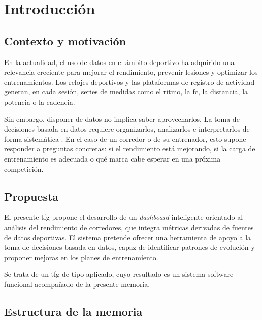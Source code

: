 \chapter{Introducción}
\label{ch:introduccion}


\section{Contexto y motivación}
\label{sec:contexto}

En la actualidad, el uso de datos en el ámbito deportivo ha adquirido una relevancia creciente para mejorar el rendimiento, prevenir lesiones y optimizar los entrenamientos. Los relojes deportivos y las plataformas de registro de actividad generan, en cada sesión, series de medidas como el ritmo, la \gls{fc}, la distancia, la potencia o la cadencia.

Sin embargo, disponer de datos no implica saber aprovecharlos. La toma de decisiones basada en datos requiere organizarlos, analizarlos e interpretarlos de forma sistemática \cite{davenport2010analytics, provost2013data}. En el caso de un corredor o de su entrenador, esto supone responder a preguntas concretas: si el rendimiento está mejorando, si la carga de entrenamiento es adecuada o qué marca cabe esperar en una próxima competición.

\section{Propuesta}
\label{sec:propuesta}

El presente \gls{tfg} propone el desarrollo de un \textit{dashboard} inteligente orientado al análisis del rendimiento de corredores, que integra métricas derivadas de fuentes de datos deportivas. El sistema pretende ofrecer una herramienta de apoyo a la toma de decisiones basada en datos, capaz de identificar patrones de evolución y proponer mejoras en los planes de entrenamiento.

Se trata de un \gls{tfg} de tipo aplicado, cuyo resultado es un sistema software funcional acompañado de la presente memoria.

\section{Estructura de la memoria}
\label{sec:estructura}

